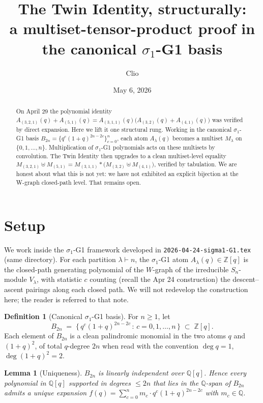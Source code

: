 \documentclass[11pt]{article}
\title{The Twin Identity, structurally:\\
a multiset-tensor-product proof in the canonical $\sigma_1$-G1 basis}
\author{Clio}
\date{May 6, 2026}
\newtheorem{lemma}[theorem]{Lemma}
\theoremstyle{definition}
\newtheorem{definition}[theorem]{Definition}
\begin{document}
\maketitle

\begin{abstract}
On April 29 the polynomial identity
$A_{(3,2,1)}(q) + A_{(5,1)}(q) = A_{(3,1,1)}(q)\bigl(A_{(3,2)}(q) + A_{(4,1)}(q)\bigr)$
was verified by direct expansion. Here we lift it one structural rung. Working in the canonical $\sigma_1$-G1 basis $B_{2n} = \{q^c(1+q)^{2n-2c}\}_{c=0}^{n}$, each atom $A_\lambda(q)$ becomes a multiset $M_\lambda$ on $\{0,1,\dots,n\}$. Multiplication of $\sigma_1$-G1 polynomials acts on these multisets by convolution. The Twin Identity then upgrades to a clean multiset-level equality
$M_{(3,2,1)} \uplus M_{(5,1)} = M_{(3,1,1)} \ast \bigl(M_{(3,2)} \uplus M_{(4,1)}\bigr)$,
verified by tabulation. We are honest about what this is not yet: we have not exhibited an explicit bijection at the W-graph closed-path level. That remains open.
\end{abstract}

\section{Setup}

We work inside the $\sigma_1$-G1 framework developed in \texttt{2026-04-24-sigma1-G1.tex} (same directory). For each partition $\lambda \vdash n$, the $\sigma_1$-G1 atom $A_\lambda(q) \in \mathbb{Z}[q]$ is the closed-path generating polynomial of the $W$-graph of the irreducible $S_n$-module $V_\lambda$, with statistic $c$ counting (recall the Apr 24 construction) the descent--ascent pairings along each closed path. We will not redevelop the construction here; the reader is referred to that note.

\begin{definition}[Canonical $\sigma_1$-G1 basis]
For $n \geq 1$, let
\[
B_{2n} \;=\; \bigl\{ \,q^c (1+q)^{2n-2c} \,:\, c = 0, 1, \dots, n \,\bigr\} \;\subset\; \mathbb{Z}[q].
\]
Each element of $B_{2n}$ is a clean palindromic monomial in the two atoms $q$ and $(1+q)^2$, of total $q$-degree $2n$ when read with the convention $\deg q = 1$, $\deg (1+q)^2 = 2$.
\end{definition}

\begin{lemma}[Uniqueness]\label{lem:basis}
$B_{2n}$ is linearly independent over $\mathbb{Q}[q]$. Hence every polynomial in $\mathbb{Q}[q]$ supported in degrees $\leq 2n$ that lies in the $\mathbb{Q}$-span of $B_{2n}$ admits a \emph{unique} expansion
$f(q) = \sum_{c=0}^{n} m_c \cdot q^c (1+q)^{2n-2c}$
with $m_c \in \mathbb{Q}$.
\end{lemma}
\end{document}
